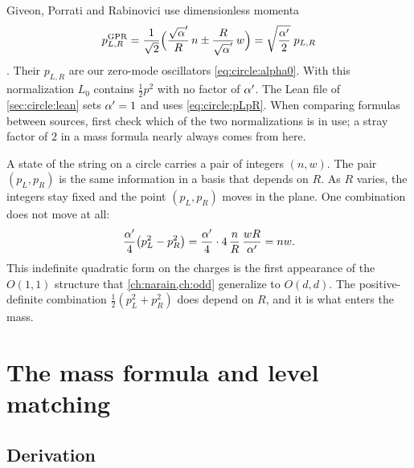 \begin{remark}\label{rem:circle:gpr}
Giveon, Porrati and Rabinovici use dimensionless momenta
\[
 p_{L,R}^{\text{GPR}}=\frac{1}{\sqrt2}\Big(\frac{\sqrt\ap}{R}\,n\pm\frac{R}{\sqrt\ap}\,w\Big)
 =\sqrt{\frac\ap2}\;p_{L,R}
\]
. Their $p_{L,R}$ are our zero-mode oscillators
\eqref{eq:circle:alpha0}. With this normalization $L_0$ contains $\frac12p^2$ with no factor
of $\alpha'$. The Lean file of \cref{sec:circle:lean} sets $\alpha'=1$ and uses
\eqref{eq:circle:pLpR}. When comparing formulas between sources, first check which of the
two normalizations is in use; a stray factor of $2$ in a mass formula nearly always comes
from here.
\end{remark}

\begin{physicsbox}
A state of the string on a circle carries a pair of integers $(n,w)$. The pair
$(p_L,p_R)$ is the same information in a basis that depends on $R$. As $R$ varies, the
integers stay fixed and the point $(p_L,p_R)$ moves in the plane. One combination does not
move at all:
\begin{equation}\label{eq:circle:norm}
 \frac{\alpha'}4\big(p_L^2-p_R^2\big)=\frac{\alpha'}4\cdot4\,\frac nR\,\frac{wR}{\alpha'}=nw .
\end{equation}
This indefinite quadratic form on the charges is the first appearance of the $O(1,1)$
structure that \cref{ch:narain,ch:odd} generalize to $O(d,d)$. The positive-definite
combination $\frac12(p_L^2+p_R^2)$ does depend on $R$, and it is what enters the mass.
\end{physicsbox}

\section{The mass formula and level matching}\label{sec:circle:mass}

\subsection{Derivation}

